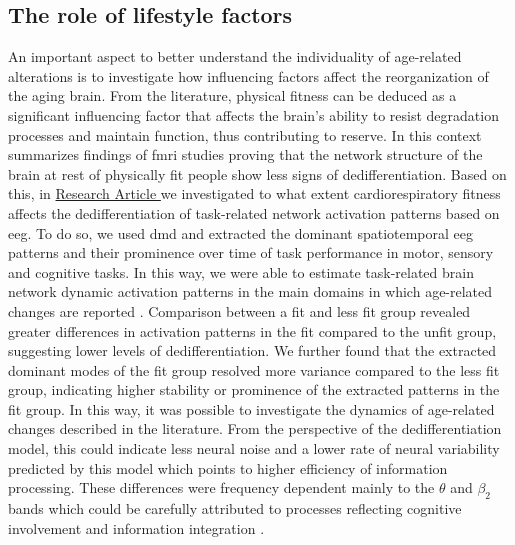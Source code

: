 \subsection{The role of lifestyle factors}
An important aspect to better understand the individuality of age-related alterations is to investigate how influencing factors affect the reorganization of the aging brain. From the literature, physical fitness can be deduced as a significant influencing factor that affects the brain's ability to resist degradation processes and maintain function, thus contributing to reserve. In this context \citeauthor{Stillman2019} \cite{Stillman2019} summarizes findings of \gls{fmri} studies proving that the network structure of the brain at rest of physically fit people show less signs of dedifferentiation. Based on this, in \hyperref[results:paperIII]{Research Article } we investigated to what extent cardiorespiratory fitness affects the dedifferentiation of task-related network activation patterns based on \gls{eeg}. To do so, we used \gls{dmd} and extracted the dominant spatiotemporal \gls{eeg} patterns and their prominence over time of task performance in motor, sensory and cognitive tasks. In this way, we were able to estimate task-related brain network dynamic activation patterns in the main domains in which age-related changes are reported \cite{Baltes1997, Sala-Llonch2015, Park2009}. Comparison between a fit and less fit group revealed greater differences in activation patterns in the fit compared to the unfit group, suggesting lower levels of dedifferentiation. We further found that the extracted dominant modes of the fit group resolved more variance compared to the less fit group, indicating higher stability or prominence of the extracted patterns in the fit group. In this way, it was possible to investigate the dynamics of age-related changes described in the literature. From the perspective of the dedifferentiation model, this could indicate less neural noise and a lower rate of neural variability predicted by this model which points to higher efficiency of information processing. These differences were frequency dependent mainly to the $\theta$ and $\beta_2$ bands which could be carefully attributed to processes reflecting cognitive involvement and information integration \cite{Siegel2012}.\\
